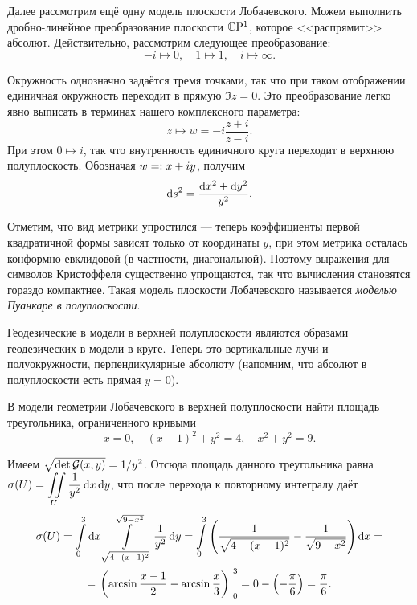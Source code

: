 Далее рассмотрим ещё одну модель плоскости Лобачевского. Можем выполнить дробно-линейное преобразование плоскости $\mathbb{C}\mathrm{P}^1$, которое <<распрямит>> абсолют. Действительно, рассмотрим следующее преобразование:
\[
	-i \mapsto 0,\quad 1 \mapsto 1,\quad i \mapsto \infty.
\]

Окружность однозначно задаётся тремя точками, так что при таком отображении единичная окружность переходит в прямую $\Im z = 0$. Это преобразование легко явно выписать в терминах нашего комплексного параметра:
\[
	z \mapsto w = -i\frac{z + i}{z - i}.
\]
При этом $0 \mapsto i$, так что внутренность единичного круга переходит в верхнюю полуплоскость. Обозначая $w = \vcentcolon x + iy$, получим
\[
	\mathop{}\!\mathrm{d} s^2 = \frac{\mathop{}\!\mathrm{d} x^2 + \mathop{}\!\mathrm{d} y^2}{y^2}.
\]

Отметим, что вид метрики упростился --- теперь коэффициенты первой квадратичной формы зависят только от координаты $y$, при этом метрика осталась конформно-евклидовой (в частности, диагональной). Поэтому выражения для символов Кристоффеля существенно упрощаются, так что вычисления становятся гораздо компактнее. Такая модель плоскости Лобачевского называется \textit{моделью Пуанкаре в полуплоскости}.

Геодезические в модели в верхней полуплоскости являются образами геодезических в модели в круге. Теперь это вертикальные лучи и полуокружности, перпендикулярные абсолюту (напомним, что абсолют в полуплоскости есть прямая $y = 0$).

\begin{problem}
	В модели геометрии Лобачевского в верхней полуплоскости найти площадь треугольника, ограниченного кривыми
	\[
		x = 0,\quad (x - 1)^2 + y^2 = 4,\quad x^2 + y^2 = 9.
	\]
\end{problem}

\begin{firstsolution}
	Имеем $\sqrt{\det\mathcal{G}(x, y)} = 1 / y^2$. Отсюда площадь данного треугольника равна $\displaystyle\sigma(U) = \iint\limits_{U}\frac{1}{y^2}\mathop{}\!\mathrm{d} x\mathop{}\!\mathrm{d} y$, что после перехода к повторному интегралу даёт
	\begin{multline*}
		\sigma(U) = \int\limits_0^3 \mathop{}\!\mathrm{d} x\int\limits_{\sqrt{4 - (x - 1)^2}}^{\sqrt{9 - x^2}}\frac{1}{y^2}\mathop{}\!\mathrm{d} y = \int\limits_0^3\left(\frac{1}{\sqrt{4 - (x - 1)^2}} - \frac{1}{\sqrt{9 - x^2}}\right)\mathop{}\!\mathrm{d} x =\\ = \left.\left(\arcsin\frac{x - 1}{2} - \arcsin\frac{x}{3}\right)\right|_0^3 = 0 - \left(-\frac{\pi}{6}\right) = \frac{\pi}{6}.
	\end{multline*}
\end{firstsolution}

